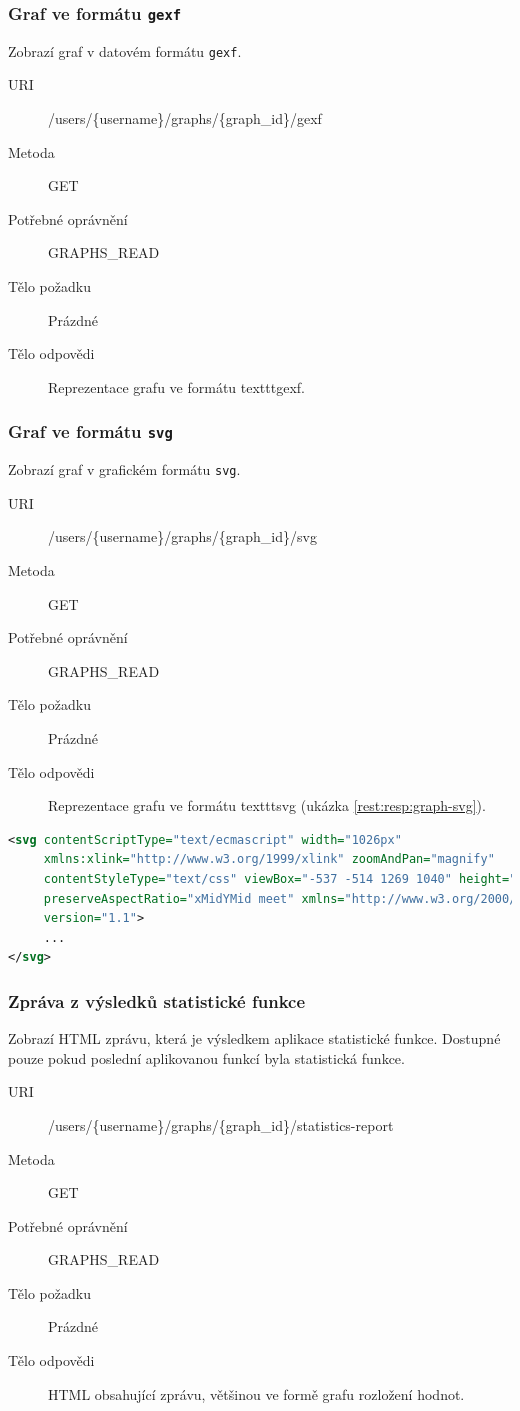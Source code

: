 \documentclass[thesis=M,czech]{FITthesis}[2014/05/6]
\begin{document}
\subsubsection{Graf ve formátu \texttt{gexf}}
Zobrazí graf v datovém formátu \texttt{gexf}.
\begin{description}
  \item[URI] /users/\{username\}/graphs/\{graph\_id\}/gexf
  \item[Metoda] GET
  \item[Potřebné oprávnění] GRAPHS\_READ
  \item[Tělo požadku] Prázdné
  \item[Tělo odpovědi] Reprezentace grafu ve formátu texttt{gexf}.
\end{description}

\subsubsection{Graf ve formátu \texttt{svg}}
Zobrazí graf v grafickém formátu \texttt{svg}.
\begin{description}
  \item[URI] /users/\{username\}/graphs/\{graph\_id\}/svg
  \item[Metoda] GET
  \item[Potřebné oprávnění] GRAPHS\_READ
  \item[Tělo požadku] Prázdné
  \item[Tělo odpovědi] Reprezentace grafu ve formátu texttt{svg} (ukázka \ref{rest:resp:graph-svg}). 
\end{description}

\begin{lstlisting}[caption=Tělo odpovědi zdroje /users/\{username\}/graphs/\{graph\_id\}/svg (GET), label=rest:resp:graph-svg, language=xml]
<svg contentScriptType="text/ecmascript" width="1026px"
     xmlns:xlink="http://www.w3.org/1999/xlink" zoomAndPan="magnify"
     contentStyleType="text/css" viewBox="-537 -514 1269 1040" height="841px"
     preserveAspectRatio="xMidYMid meet" xmlns="http://www.w3.org/2000/svg"
     version="1.1">
     ...
</svg>
\end{lstlisting}  

\subsubsection{Zpráva z výsledků statistické funkce}
Zobrazí HTML zprávu, která je výsledkem aplikace statistické funkce. Dostupné pouze pokud poslední aplikovanou funkcí byla statistická funkce.
\begin{description}
  \item[URI] /users/\{username\}/graphs/\{graph\_id\}/statistics-report
  \item[Metoda] GET
  \item[Potřebné oprávnění] GRAPHS\_READ
  \item[Tělo požadku] Prázdné
  \item[Tělo odpovědi] HTML obsahující zprávu, většinou ve formě grafu rozložení hodnot. 
\end{description}
\end{document}
